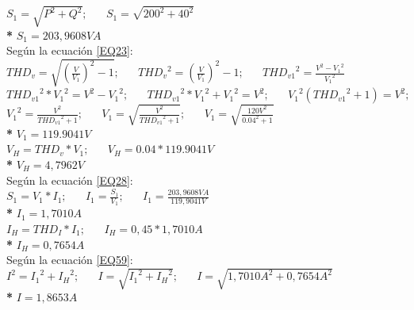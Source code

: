 $S_{1} = \sqrt{P^2 + Q^2}; \;\;\;\;\;\; S_{1} = \sqrt{200^2 + 40^2} $\\

\textbf{* }$S_{1} = 203,9608 VA$\\

Según la ecuación \ref{EQ23}:\\

$THD_{v}=\sqrt{\left(\frac{V}{V_{1}}\right)^2-1} ;  \;\;\;\;\;\; {THD_{v}}^2=\left(\frac{V}{V_{1}}\right)^2 - 1;  \;\;\;\;\;\;
{THD_{v1}}^2=\frac{{V}^2 - {{V}_{1}}^2}{{V_{1}}^2} $\\

${THD_{v1}}^2*{{V_{1}}^2}={{V}^2 - {{V}_{1}}^2}; \;\;\;\;\;\;
{THD_{v1}}^2*{{V_{1}}^2} + {{V}_{1}}^2={{V}^2}; \;\;\;\;\;\;
{V_{1}}^2 ({THD_{v1}}^2 + 1)={{V}^2}; \;\;\;\;\;\;$\\

${V_{1}}^2 = \frac{{{V}^2}}{{THD_{v1}}^2 + 1}; \;\;\;\;\;\;
V_{1} = \sqrt{\frac{{{V}^2}}{{THD_{v1}}^2 + 1}}; \;\;\;\;\;\;
V_{1} = \sqrt{\frac{{{120V}^2}}{{0.04}^2 + 1}}$\\

\textbf{* }$V_{1} = 119.9041V$\\

$V_{H} = THD_{v}*V_{1};  \;\;\;\;\;\;
V_{H} = 0.04 * 119.9041V$\\

\textbf{* }$V_{H} = 4,7962 V$\\

Según la ecuación \ref{EQ28}:\\

$S_{1} = V_{1}*I_{1}; \;\;\;\;\;\;
I_{1} = \frac{S_{1}}{V_{1}}; \;\;\;\;\;\;
I_{1} = \frac{203,9608VA}{119,9041V}$\\

\textbf{* }$I_{1} = 1,7010A$\\

$I_{H} = THD_{I} * I_{1}; \;\;\;\;\;\;
I_{H} = 0,45 * 1,7010A$\\

\textbf{* }$I_{H} = 0,7654A$\\

Según la ecuación \ref{EQ59}:\\

$I^2 = {I_{1}}^2 + {I_{H}}^2; \;\;\;\;\;\;
I = \sqrt{{I_{1}}^2 + {I_{H}}^2}; \;\;\;\;\;\;
I = \sqrt{{1,7010A}^2 + {0,7654A}^2}$\\

\textbf{* }$I = 1,8653A$\\

